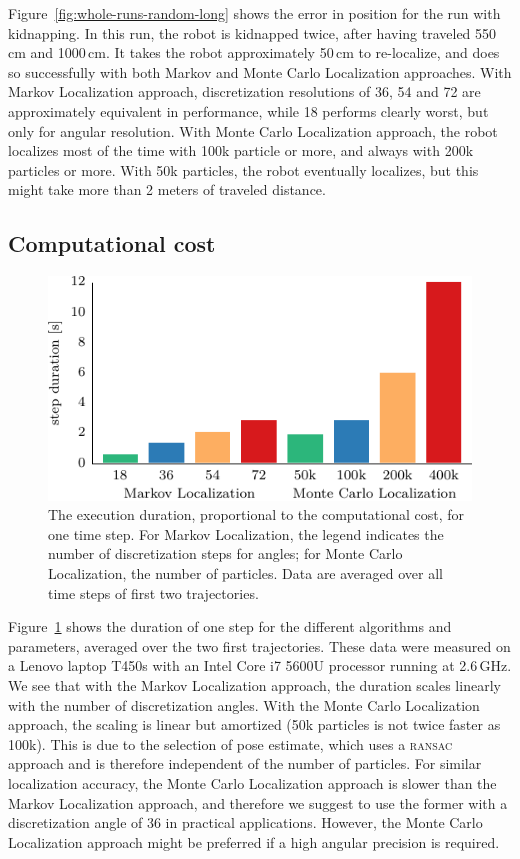 \documentclass[letterpaper, 10pt, conference]{ieeeconf}
\newcommand{\Fig}[1]{Figure~\ref{fig:#1}}
\begin{document}
\Fig{whole-runs-random-long} shows the error in position for the run with kidnapping.
In this run, the robot is kidnapped twice, after having traveled 550\,cm and 1000\,cm.
It takes the robot approximately 50\,cm to re-localize, and does so successfully with both Markov and Monte Carlo Localization approaches.
With Markov Localization approach, discretization resolutions of 36, 54 and 72 are approximately equivalent in performance, while 18 performs clearly worst, but only for angular resolution.
With Monte Carlo Localization approach, the robot localizes most of the time with 100k particle or more, and always with 200k particles or more.
With 50k particles, the robot eventually localizes, but this might take more than 2 meters of traveled distance.

\subsection{Computational cost}

\begin{figure}
\includegraphics{cpu_load}
\caption{The execution duration, proportional to the computational cost, for one time step.
For Markov Localization, the legend indicates the number of discretization steps for angles; for Monte Carlo Localization, the number of particles.
Data are averaged over all time steps of first two trajectories.}
\label{fig:cpuload}
\end{figure}

\Fig{cpuload} shows the duration of one step for the different algorithms and parameters, averaged over the two first trajectories.
These data were measured on a Lenovo laptop T450s with an Intel Core i7 5600U processor running at 2.6\,GHz.
We see that with the Markov Localization approach, the duration scales linearly with the number of discretization angles.
With the Monte Carlo Localization approach, the scaling is linear but amortized (50k particles is not twice faster as 100k).
This is due to the selection of pose estimate, which uses a \textsc{ransac} approach and is therefore independent of the number of particles.
For similar localization accuracy, the Monte Carlo Localization approach is slower than the Markov Localization approach, and therefore we suggest to use the former with a discretization angle of 36 in practical applications.
However, the Monte Carlo Localization approach might be preferred if a high angular precision is required.
\end{document}
